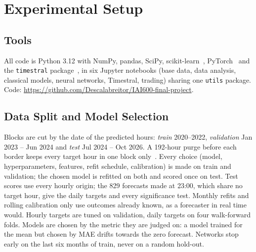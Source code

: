 \section{Experimental Setup}
\label{sec:setup}

\subsection{Tools}
\label{sec:tools}
All code is Python 3.12 with NumPy, pandas, SciPy,
scikit-learn~\cite{pedregosa2011}, PyTorch~\cite{paszke2019} and the
\texttt{timestral} package~\cite{timestral}, in six Jupyter notebooks
(base data, data analysis, classical models, neural networks, Timestral,
trading) sharing one \texttt{utils} package. Code:
\url{https://github.com/Descalabreitor/IAI600-final-project}.

\subsection{Data Split and Model Selection}
\label{sec:split}
Blocks are cut by the date of the predicted hours: \emph{train}
2020--2022, \emph{validation} Jan 2023 -- Jun 2024 and \emph{test} Jul
2024 -- Oct 2026. A 192-hour purge before each border keeps every target
hour in one block only~\cite{lopezdeprado2018}. Every choice (model,
hyperparameters, features, refit schedule, calibration) is made on train
and validation; the chosen model is refitted on both and scored once on
test. Test scores use every hourly origin; the 829 forecasts made at
23:00, which share no target hour, give the daily targets and every
significance test. Monthly refits and rolling calibration only use
outcomes already known, as a forecaster in real time would. Hourly
targets are tuned on validation, daily targets on four walk-forward
folds. Models are chosen by the metric they are judged on: a model
trained for the mean but chosen by MAE drifts towards the zero forecast.
Networks stop early on the last six months of train, never on a random
hold-out.

